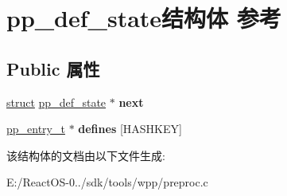 \hypertarget{structpp__def__state}{}\section{pp\+\_\+def\+\_\+state结构体 参考}
\label{structpp__def__state}
\subsection*{Public 属性}
\begin{DoxyCompactItemize}
\item 
\mbox{\label{structpp__def__state_ae855070e161b3dc0d8cda19ace317bbc}} 
\hyperlink{interfacestruct}{struct} \hyperlink{structpp__def__state}{pp\+\_\+def\+\_\+state} $\ast$ {\bfseries next}
\item 
\mbox{\label{structpp__def__state_ae7bc581a41a0dc8559ed6d611c22d657}} 
\hyperlink{structpp__entry}{pp\+\_\+entry\+\_\+t} $\ast$ {\bfseries defines} \mbox{[}H\+A\+S\+H\+K\+EY\mbox{]}
\end{DoxyCompactItemize}


该结构体的文档由以下文件生成\+:\begin{DoxyCompactItemize}
\item 
E\+:/\+React\+O\+S-\/0../sdk/tools/wpp/preproc.\+c\end{DoxyCompactItemize}
